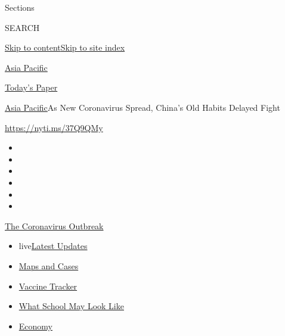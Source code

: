 Sections

SEARCH

\protect\hyperlink{site-content}{Skip to
content}\protect\hyperlink{site-index}{Skip to site index}

\href{https://www.nytimes3xbfgragh.onion/section/world/asia}{Asia
Pacific}

\href{https://myaccount.nytimes3xbfgragh.onion/auth/login?response_type=cookie\&client_id=vi}{}

\href{https://www.nytimes3xbfgragh.onion/section/todayspaper}{Today's
Paper}

\href{/section/world/asia}{Asia Pacific}\textbar{}As New Coronavirus
Spread, China's Old Habits Delayed Fight

\url{https://nyti.ms/37Q9QMy}

\begin{itemize}
\item
\item
\item
\item
\item
\item
\end{itemize}

\href{https://www.nytimes3xbfgragh.onion/news-event/coronavirus?action=click\&pgtype=Article\&state=default\&region=TOP_BANNER\&context=storylines_menu}{The
Coronavirus Outbreak}

\begin{itemize}
\tightlist
\item
  live\href{https://www.nytimes3xbfgragh.onion/2020/08/02/world/coronavirus-updates.html?action=click\&pgtype=Article\&state=default\&region=TOP_BANNER\&context=storylines_menu}{Latest
  Updates}
\item
  \href{https://www.nytimes3xbfgragh.onion/interactive/2020/us/coronavirus-us-cases.html?action=click\&pgtype=Article\&state=default\&region=TOP_BANNER\&context=storylines_menu}{Maps
  and Cases}
\item
  \href{https://www.nytimes3xbfgragh.onion/interactive/2020/science/coronavirus-vaccine-tracker.html?action=click\&pgtype=Article\&state=default\&region=TOP_BANNER\&context=storylines_menu}{Vaccine
  Tracker}
\item
  \href{https://www.nytimes3xbfgragh.onion/interactive/2020/07/29/us/schools-reopening-coronavirus.html?action=click\&pgtype=Article\&state=default\&region=TOP_BANNER\&context=storylines_menu}{What
  School May Look Like}
\item
  \href{https://www.nytimes3xbfgragh.onion/live/2020/07/31/business/stock-market-today-coronavirus?action=click\&pgtype=Article\&state=default\&region=TOP_BANNER\&context=storylines_menu}{Economy}
\end{itemize}

